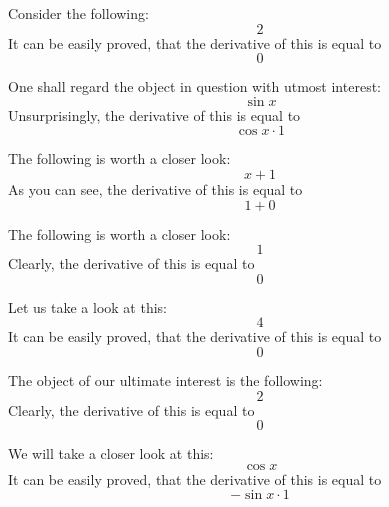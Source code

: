 \documentclass{article}
\begin{document}
Consider the following:
\begin{equation}
2 
\end{equation}
It can be easily proved, that the derivative of this is equal to
\begin{equation}
0 
\end{equation}

One shall regard the object in question with utmost interest:
\begin{equation}
\sin x 
\end{equation}
Unsurprisingly, the derivative of this is equal to
\begin{equation}
\cos x \cdot 1 
\end{equation}

The following is worth a closer look:
\begin{equation}
x + 1 
\end{equation}
As you can see, the derivative of this is equal to
\begin{equation}
1 + 0 
\end{equation}

The following is worth a closer look:
\begin{equation}
1 
\end{equation}
Clearly, the derivative of this is equal to
\begin{equation}
0 
\end{equation}

Let us take a look at this:
\begin{equation}
4 
\end{equation}
It can be easily proved, that the derivative of this is equal to
\begin{equation}
0 
\end{equation}

The object of our ultimate interest is the following:
\begin{equation}
2 
\end{equation}
Clearly, the derivative of this is equal to
\begin{equation}
0 
\end{equation}

We will take a closer look at this:
\begin{equation}
\cos x 
\end{equation}
It can be easily proved, that the derivative of this is equal to
\begin{equation}
-\sin x \cdot 1 
\end{equation}
\end{document}
